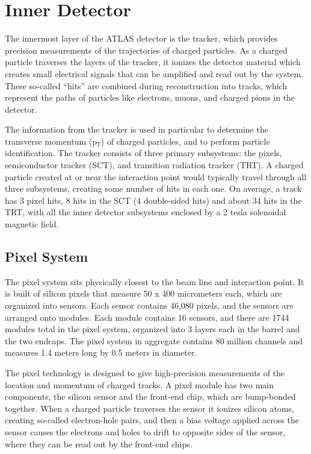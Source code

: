 \documentclass[11pt]{article}
\title{}
\author{}
\date{} %
\begin{document}
\maketitle
\tableofcontents
\label{sec:atlas}

\section{Inner Detector}

The innermost layer of the ATLAS detector is the tracker, which provides precision measurements of the trajectories of charged particles.  As a charged particle traverses the layers of the tracker, it ionizes the detector material which creates small electrical signals that can be amplified and read out by the system.  These so-called ``hits'' are combined during reconstruction into tracks, which represent the paths of particles like electrons, muons, and charged pions in the detector.

The information from the tracker is used in particular to determine the transverse momentum (p$_T$) of charged particles, and to perform particle identification.  The tracker consists of three primary subsystems: the pixels, semiconductor tracker (SCT), and transition radiation tracker (TRT).  A charged particle created at or near the interaction point would typically travel through all three subsystems, creating some number of hits in each one.  On average, a track has 3 pixel hits, 8 hits in the SCT (4 double-sided hits) and about 34 hits in the TRT, with all the inner detector subsystems enclosed by a 2 tesla solenoidal magnetic field. 

\subsection{Pixel System}
The pixel system sits physically closest to the beam line and interaction point.  It is built of silicon pixels that measure 50 x 400 micrometers each, which are organized into sensors.  Each sensor contains 46,080 pixels, and the sensors are arranged onto modules.  Each module contains 16 sensors, and there are 1744 modules total in the pixel system, organized into 3 layers each in the barrel and the two endcaps.  The pixel system in aggregate contains 80 million channels and measures 1.4 meters long by 0.5 meters in diameter.

The pixel technology is designed to give high-precision measurements of the location and momentum of charged tracks.  A pixel module has two main components, the silicon sensor and the front-end chip, which are bump-bonded together.  When a charged particle traverses the sensor it ionizes silicon atoms, creating so-called electron-hole pairs, and then a bias voltage applied across the sensor causes the electrons and holes to drift to opposite sides of the sensor, where they can be read out by the front-end chips.  
\end{document}
